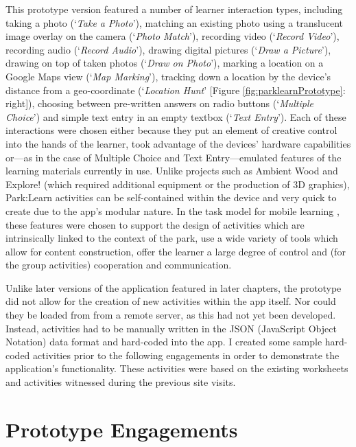 This prototype version featured a number of learner interaction types, including taking a photo (`\textit{Take a Photo}'), matching an existing photo using a translucent image overlay on the camera (`\textit{Photo Match}'), recording video (`\textit{Record Video}'), recording audio (`\textit{Record Audio}'), drawing digital pictures (`\textit{Draw a Picture}'), drawing on top of taken photos (`\textit{Draw on Photo}'), marking a location on a Google Maps view (`\textit{Map Marking}'), tracking down a location by the device’s distance from a geo-coordinate (`\textit{Location Hunt}' [Figure \ref{fig:parklearnPrototype}: right]), choosing between pre-written answers on radio buttons (`\textit{Multiple Choice}') and simple text entry in an empty textbox (`\textit{Text Entry}'). Each of these interactions were chosen either because they put an element of creative control into the hands of the learner, took advantage of the devices’ hardware capabilities or---as in the case of Multiple Choice and Text Entry---emulated features of the learning materials currently in use. Unlike projects such as Ambient Wood \citep{Rogers2004} and Explore! \citep{Costabile2008} (which required additional equipment or the production of 3D graphics), Park:Learn activities can be self-contained within the device and very quick to create due to the app’s modular nature. In the task model for mobile learning \citep{Sharples2013}, these features were chosen to support the design of activities which are intrinsically linked to the context of the park, use a wide variety of tools which allow for content construction, offer the learner a large degree of control and (for the group activities) cooperation and communication. 

Unlike later versions of the application featured in later chapters, the prototype did not allow for the creation of new activities within the app itself. Nor could they be loaded from from a remote server, as this had not yet been developed. Instead, activities had to be manually written in the JSON (JavaScript Object Notation) data format and hard-coded into the app. I created some sample hard-coded activities prior to the following engagements in order to demonstrate the application's functionality. These activities were based on the existing worksheets and activities witnessed during the previous site visits.

\section{Prototype Engagements}

